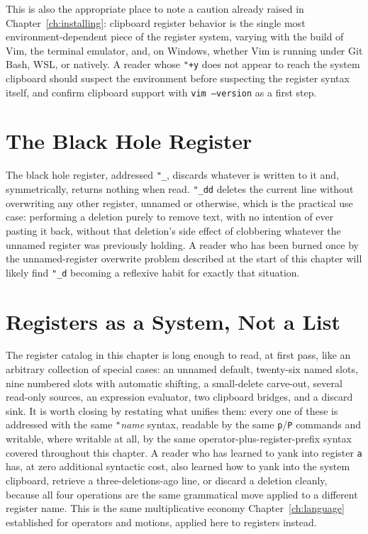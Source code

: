 This is also the appropriate place to note a caution already raised in Chapter~\ref{ch:installing}: clipboard register behavior is the single most environment-dependent piece of the register system, varying with the build of Vim, the terminal emulator, and, on Windows, whether Vim is running under Git Bash, WSL, or natively. A reader whose \texttt{"+y} does not appear to reach the system clipboard should suspect the environment before suspecting the register syntax itself, and confirm clipboard support with \texttt{vim --version} as a first step.

\section{The Black Hole Register}

The black hole register, addressed \texttt{"\_}, discards whatever is written to it and, symmetrically, returns nothing when read. \texttt{"\_dd} deletes the current line without overwriting any other register, unnamed or otherwise, which is the practical use case: performing a deletion purely to remove text, with no intention of ever pasting it back, without that deletion's side effect of clobbering whatever the unnamed register was previously holding. A reader who has been burned once by the unnamed-register overwrite problem described at the start of this chapter will likely find \texttt{"\_d} becoming a reflexive habit for exactly that situation.

\section{Registers as a System, Not a List}

The register catalog in this chapter is long enough to read, at first pass, like an arbitrary collection of special cases: an unnamed default, twenty-six named slots, nine numbered slots with automatic shifting, a small-delete carve-out, several read-only sources, an expression evaluator, two clipboard bridges, and a discard sink. It is worth closing by restating what unifies them: every one of these is addressed with the same \texttt{"}\textit{name} syntax, readable by the same \texttt{p}/\texttt{P} commands and writable, where writable at all, by the same operator-plus-register-prefix syntax covered throughout this chapter. A reader who has learned to yank into register \texttt{a} has, at zero additional syntactic cost, also learned how to yank into the system clipboard, retrieve a three-deletions-ago line, or discard a deletion cleanly, because all four operations are the same grammatical move applied to a different register name. This is the same multiplicative economy Chapter~\ref{ch:language} established for operators and motions, applied here to registers instead.
